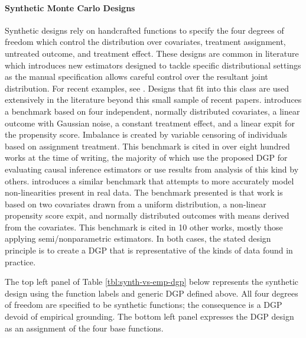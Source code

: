 \documentclass[../main.tex]{subfiles}
\begin{document}
\vspace{\baselineskip}
\paragraph*{Synthetic Monte Carlo Designs}\par


\vspace{\baselineskip}
Synthetic designs rely on handcrafted functions to specify the four degrees of freedom which control the distribution over covariates, treatment assignment, untreated outcome, and treatment effect. These designs are common in literature which introduces new estimators designed to tackle specific distributional settings as the manual specification allows careful control over the resultant joint distribution. For recent examples, see \textcite{Kunzel2018TransferNetworks, Johansson2018LearningDesigns, Johansson2016LearningInference}. Designs that fit into this class are used extensively in the literature beyond this small sample of recent papers. \textcite{Kang2007Demystifying1} introduces a benchmark based on four independent, normally distributed covariates, a linear outcome with Gaussian noise, a constant treatment effect, and a linear expit for the propensity score. Imbalance is created by variable censoring of individuals based on assignment treatment. This benchmark is cited in over eight hundred works at the time of writing, the majority of which use the proposed DGP for evaluating causal inference estimators or use results from analysis of this kind by others. \textcite{Kallus2016AInference} introduces a similar benchmark that attempts to more accurately model non-linearities present in real data. The benchmark presented is that work is based on two covariates drawn from a uniform distribution, a non-linear propensity score expit, and normally distributed outcomes with means derived from the covariates. This benchmark is cited in 10 other works, mostly those applying semi/nonparametric estimators. In both cases, the stated design principle is to create a DGP that is representative of the kinds of data found in practice.\par


\vspace{\baselineskip}
The top left panel of Table \ref{tbl:synth-vs-emp-dgp} below represents the synthetic design using the function labels and generic DGP defined above. All four degrees of freedom are specified to be synthetic functions; the consequence is a DGP devoid of empirical grounding. The bottom left panel expresses the \textcite{Kang2007DemystifyingData} DGP design as an assignment of the four base functions.\par
\end{document}
